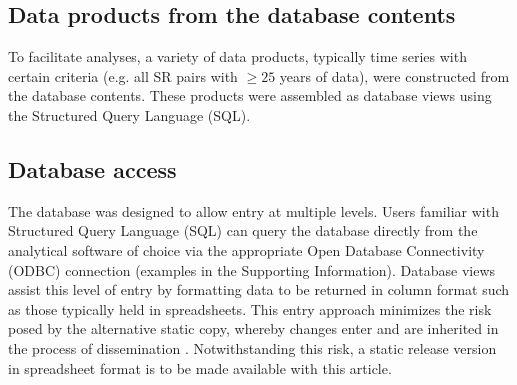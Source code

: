 \documentclass[letterpaper,12pt]{article}
\begin{document}
\subsection{Data products from the database contents}
To facilitate analyses, a variety of data products, typically time series with certain criteria (e.g. all SR pairs with $\ge25$ years of data), were constructed
from the database contents. These products were assembled as database
views using the Structured Query Language (SQL).

\subsection{Database access}
The database was designed to allow entry at multiple levels. Users
familiar with Structured Query Language (SQL) can query the database
directly from the analytical software of choice via the appropriate
Open Database Connectivity (ODBC) connection (examples in the
Supporting Information). Database views assist this level of entry by
formatting data to be returned in column format such as those
typically held in spreadsheets. This entry approach minimizes the risk
posed by the alternative static copy, whereby changes enter and are
inherited in the process of dissemination \citep[for a literary example]{Barbrook:Howe:Blake:Robinson:1998:nature}.
Notwithstanding this risk, a static release version in spreadsheet
format is to be made available with this article.
\end{document}
